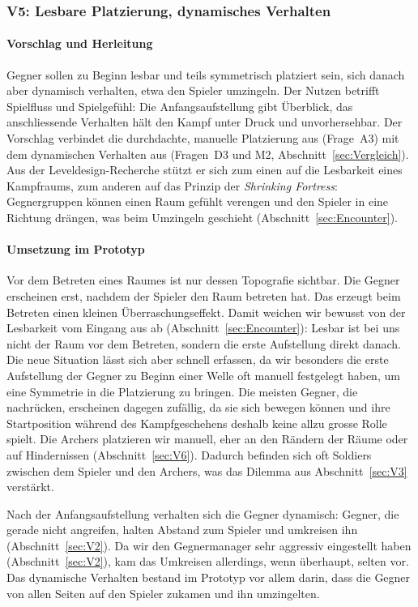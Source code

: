 \documentclass[../Main.tex]{subfiles}
\begin{document}
\subsubsection{V5: Lesbare Platzierung, dynamisches Verhalten} \label{sec:V5}

\paragraph{Vorschlag und Herleitung}
Gegner sollen zu Beginn lesbar und teils symmetrisch platziert sein, sich danach aber dynamisch verhalten, etwa den Spieler umzingeln. Der Nutzen betrifft Spielfluss und Spielgefühl: Die Anfangsaufstellung gibt Überblick, das anschliessende Verhalten hält den Kampf unter Druck und unvorhersehbar. Der Vorschlag verbindet die durchdachte, manuelle Platzierung aus  (Frage~A3) mit dem dynamischen Verhalten aus  (Fragen~D3 und M2, Abschnitt~\ref{sec:Vergleich}). Aus der Leveldesign-Recherche stützt er sich zum einen auf die Lesbarkeit eines Kampfraums, zum anderen auf das Prinzip der \textit{Shrinking Fortress}: Gegnergruppen können einen Raum gefühlt verengen und den Spieler in eine Richtung drängen, was beim Umzingeln geschieht (Abschnitt~\ref{sec:Encounter}).

\paragraph{Umsetzung im Prototyp}
Vor dem Betreten eines Raumes ist nur dessen Topografie sichtbar. Die Gegner erscheinen erst, nachdem der Spieler den Raum betreten hat. Das erzeugt beim Betreten einen kleinen Überraschungseffekt. Damit weichen wir bewusst von der Lesbarkeit vom Eingang aus ab (Abschnitt~\ref{sec:Encounter}): Lesbar ist bei uns nicht der Raum vor dem Betreten, sondern die erste Aufstellung direkt danach. Die neue Situation lässt sich aber schnell erfassen, da wir besonders die erste Aufstellung der Gegner zu Beginn einer Welle oft manuell festgelegt haben, um eine Symmetrie in die Platzierung zu bringen. Die meisten Gegner, die nachrücken, erscheinen dagegen zufällig, da sie sich bewegen können und ihre Startposition während des Kampfgeschehens deshalb keine allzu grosse Rolle spielt. Die Archers platzieren wir manuell, eher an den Rändern der Räume oder auf Hindernissen (Abschnitt~\ref{sec:V6}). Dadurch befinden sich oft Soldiers zwischen dem Spieler und den Archers, was das Dilemma aus Abschnitt~\ref{sec:V3} verstärkt.

Nach der Anfangsaufstellung verhalten sich die Gegner dynamisch: Gegner, die gerade nicht angreifen, halten Abstand zum Spieler und umkreisen ihn (Abschnitt~\ref{sec:V2}). Da wir den Gegnermanager sehr aggressiv eingestellt haben (Abschnitt~\ref{sec:V2}), kam das Umkreisen allerdings, wenn überhaupt, selten vor. Das dynamische Verhalten bestand im Prototyp vor allem darin, dass die Gegner von allen Seiten auf den Spieler zukamen und ihn umzingelten.
\end{document}
